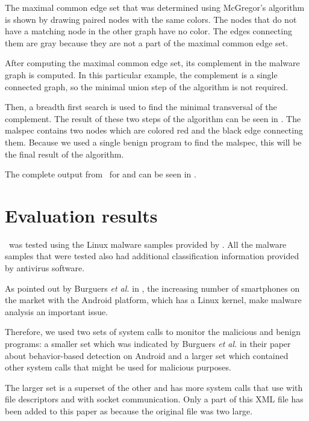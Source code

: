 The maximal common edge set that was determined using McGregor's algorithm is shown by drawing paired nodes with the same colors. The nodes that do not have a matching node in the other graph have no color. The edges connecting them are gray because they are not a part of the maximal common edge set.

After computing the maximal common edge set, its complement in the malware graph is computed. In this particular example, the complement is a single connected graph, so the minimal union step of the algorithm is not required.

Then, a breadth first search is used to find the minimal transversal of the complement. The result of these two steps of the algorithm can be seen in . The malspec contains two nodes which are colored red and the black edge connecting them. Because we used a single benign program to find the malspec, this will be the final result of the algorithm.


The complete output from \project\ for  and  can be seen in .

\section{Evaluation results}
\label{fifth:evaluation-results}

\project\ was tested using the Linux malware samples provided by \cite{open-malware}. All the malware samples that were tested also had additional classification information provided by antivirus software.

As pointed out by Burguers \textit{et al.} in \cite{crowdroid-malware-android}, the increasing number of smartphones on the market with the Android platform, which has a Linux kernel, make malware analysis an important issue.

Therefore, we used two sets of system calls to monitor the malicious and benign programs: a smaller set which was indicated by Burguers \textit{et al.} in their paper about behavior-based detection on Android \cite{crowdroid-malware-android} and a larger set which contained other system calls that might be used for malicious purposes.

The larger set is a superset of the other and has more system calls that use with file descriptors and with socket communication. Only a part of this XML file has been added to this paper as  because the original file was two large.


